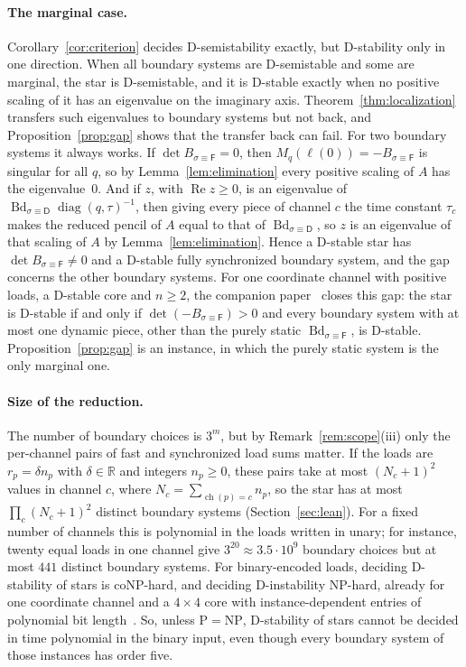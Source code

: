 \documentclass[11pt,a4paper]{article}
\theoremstyle{plain}
\theoremstyle{definition}
\theoremstyle{remark}
\newcommand{\R}{\mathbb{R}}
\newcommand{\Real}{\operatorname{Re}}
\newcommand{\diag}{\operatorname{diag}}
\newcommand{\Bd}{\operatorname{Bd}}
\newcommand{\ch}{\operatorname{ch}}
\newcommand{\rF}{\mathsf{F}}
\newcommand{\rD}{\mathsf{D}}
\begin{document}
\paragraph{The marginal case.} Corollary~\ref{cor:criterion} decides D-semistability exactly,
but D-stability only in one direction. When all boundary systems are D-semistable and some
are marginal, the star is D-semistable, and it is D-stable exactly when no positive scaling
of it has an eigenvalue on the imaginary axis. Theorem~\ref{thm:localization} transfers such
eigenvalues to boundary systems but not back, and Proposition~\ref{prop:gap} shows that the
transfer back can fail. For two boundary systems it always works. If
$\det B_{\sigma\equiv\rF}=0$, then $M_q(\ell(0))=-B_{\sigma\equiv\rF}$ is singular for all
$q$, so by Lemma~\ref{lem:elimination} every positive scaling of $A$ has the eigenvalue~$0$.
And if $z$, with $\Real z\ge0$, is an eigenvalue of $\Bd_{\sigma\equiv\rD}\diag(q,\tau)^{-1}$,
then giving every piece of channel $c$ the time constant $\tau_c$ makes the reduced pencil of
$A$ equal to that of $\Bd_{\sigma\equiv\rD}$, so $z$ is an eigenvalue of that scaling of $A$ by
Lemma~\ref{lem:elimination}. Hence a D-stable star has $\det B_{\sigma\equiv\rF}\ne0$ and a
D-stable fully synchronized boundary system, and the gap concerns the other boundary systems.
For one coordinate channel with positive loads, a D-stable core and
$n\ge2$, the companion paper~\cite[Lemma~6.1]{companionI2026} closes this gap: the star is
D-stable if and only if $\det(-B_{\sigma\equiv\rF})>0$ and every boundary system with at most
one dynamic piece, other than the purely static $\Bd_{\sigma\equiv\rF}$, is D-stable.
Proposition~\ref{prop:gap} is an instance, in which the purely static system is the only
marginal one.

\paragraph{Size of the reduction.} The number of boundary choices is $3^m$, but by
Remark~\ref{rem:scope}(iii) only the per-channel pairs of fast and synchronized load sums
matter. If the loads are $r_p=\delta n_p$ with $\delta\in\R$ and integers $n_p\ge0$, these
pairs take at most $(N_c+1)^2$ values in channel $c$, where $N_c=\sum_{\ch(p)=c}n_p$, so the
star has at most $\prod_c(N_c+1)^2$ distinct boundary systems (Section~\ref{sec:lean}). For a
fixed number of channels this is polynomial in the loads written in unary; for instance,
twenty equal loads in one channel give $3^{20}\approx3.5\cdot10^{9}$ boundary choices but at
most $441$ distinct boundary systems. For binary-encoded loads, deciding D-stability of stars
is coNP-hard, and deciding D-instability NP-hard, already for one coordinate channel and a
$4\times4$ core with instance-dependent entries of polynomial bit
length~\cite{companionHard2026}. So, unless $\mathrm{P}=\mathrm{NP}$, D-stability of stars
cannot be decided in time polynomial in the binary input, even though every boundary system
of those instances has order five.
\end{document}
